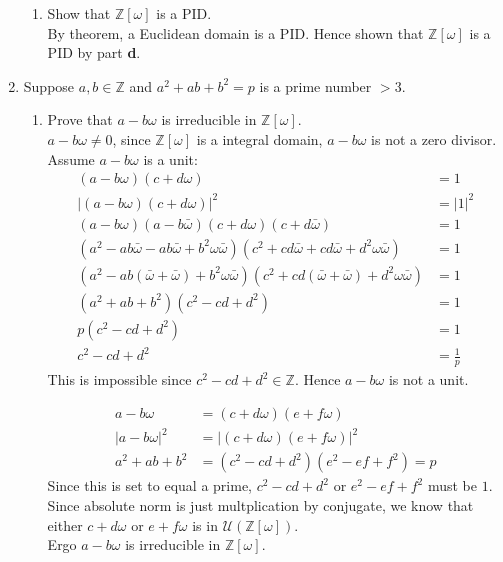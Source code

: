 \documentclass[12pt]{article}
\begin{document}
\begin{enumerate}
\begin{enumerate}
			\item Show that $\mathbb{Z}[\omega]$ is a PID.\\
				By theorem, a Euclidean domain is a PID. Hence shown that
				$\mathbb{Z}[\omega]$ is a PID by part \textbf{d}.
		\end{enumerate}

	\item Suppose $a, b \in \mathbb{Z}$ and $a^2 + ab+b^2 = p$ is a prime number
		$>3$.
	\begin{enumerate}
		\item Prove that $a-b\omega$ is irreducible in $\mathbb{Z}[\omega]$.\\
			$a-b\omega \neq 0$, since $\mathbb{Z}[\omega]$ is a integral domain,
			$a-b\omega$ is not a zero divisor.\\
			Assume $a-b\omega$ is a unit:
			\begin{align*}
				(a-b\omega)(c+d\omega) &= 1\\
				|(a-b\omega)(c+d\omega)|^2 &= |1|^2\\
				(a-b\omega)(a-b\bar\omega)(c+d\omega)(c+d\bar\omega) &= 1\\
				(a^2 -ab\bar\omega - ab\bar\omega + b^2\omega\bar\omega)
				(c^2 + cd\bar\omega + cd\bar\omega + d^2\omega\bar\omega) &= 1\\
				(a^2 -ab(\bar\omega +\bar\omega) + b^2\omega\bar\omega)
				(c^2 + cd(\bar\omega + \bar\omega) + d^2\omega\bar\omega) &= 1\\
				(a^2 + ab + b^2)(c^2-cd+d^2) &= 1\\
				p(c^2-cd+d^2) &= 1\\
				c^2-cd+d^2 &= \frac{1}{p}
			\end{align*}
			This is impossible since $c^2-cd+d^2 \in \mathbb{Z}$. Hence $a-b\omega$ is
			not a unit.

			\begin{align*}
				a-b\omega &= (c+d\omega)(e+f\omega)\\
				|a-b\omega|^2 &= |(c+d\omega)(e+f\omega)|^2\\
				a^2 + ab + b^2 &= (c^2-cd+d^2)(e^2-ef+f^2) = p
			\end{align*}
			Since this is set to equal a prime, $c^2-cd+d^2$ or $e^2-ef+f^2$ must
			be $1$. Since absolute norm is just multplication by conjugate, we know
			that either $c+d\omega$ or $e+f\omega$ is in
			$\mathcal{U}(\mathbb{Z}[\omega])$.\\
			Ergo $a-b\omega$ is irreducible in $\mathbb{Z}[\omega]$.
			

\end{enumerate}
\end{enumerate}
\end{document}

